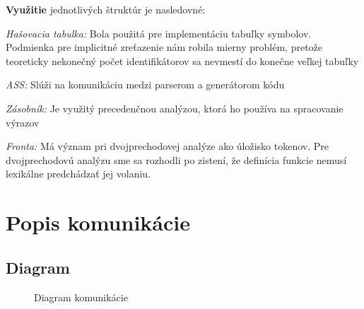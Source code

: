 \documentclass[Slovak, a4paper, 12pt]{article}
\begin{document}
	\noindent \textbf{Využitie} jednotlivých štruktúr je nasledovné:\\
	\par\textit{Hašovacia tabulka: } Bola použitá pre implementáciu tabuľky symbolov. Podmienka pre implicitné zreťazenie nám 
	robila mierny problém, pretože teoreticky nekonečný počet identifikátorov sa nevmestí do konečne veľkej tabuľky \\
	\par\textit{ASS: } Slúži na komunikáciu medzi parserom a generátorom kódu\\
	\par\textit{Zásobník: } Je využitý precedenčnou analýzou, ktorá ho používa na spracovanie výrazov\\
	\par\textit{Fronta: } Má význam pri dvojprechodovej analýze ako úložisko tokenov. Pre dvojprechodovú analýzu sme sa rozhodli po
	zistení, že definícia funkcie nemusí lexikálne predchádzať jej volaniu.
	
	\newpage
	\section{Popis komunikácie}
	\subsection{Diagram}
	
	\begin{figure}[ht]
		\begin{center}
			\caption{Diagram komunikácie}
		\end{center}
	\end{figure}
\end{document}
